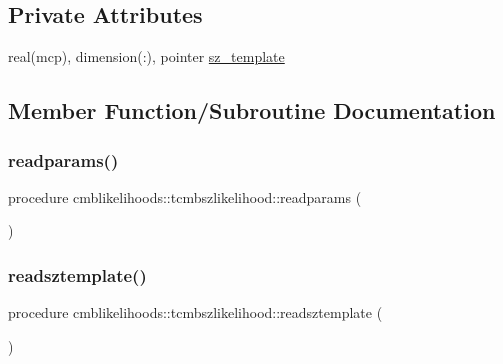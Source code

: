 \subsection*{Private Attributes}
\begin{DoxyCompactItemize}
\item 
real(mcp), dimension(\+:), pointer \mbox{\hyperlink{structcmblikelihoods_1_1tcmbszlikelihood_a625b6c3263513211095b9b106aa01453}{sz\+\_\+template}}
\end{DoxyCompactItemize}


\subsection{Member Function/\+Subroutine Documentation}
\mbox{\label{structcmblikelihoods_1_1tcmbszlikelihood_a4db5c38bc1d6c5e67be755992f6c43f3}} 
\subsubsection{\texorpdfstring{readparams()}{readparams()}}
{\footnotesize\ttfamily procedure cmblikelihoods\+::tcmbszlikelihood\+::readparams (\begin{DoxyParamCaption}{ }\end{DoxyParamCaption})\hspace{0.3cm}{\ttfamily [private]}}

\mbox{\label{structcmblikelihoods_1_1tcmbszlikelihood_ae72cb577ffc417efa59274dc1bcaf100}} 
\subsubsection{\texorpdfstring{readsztemplate()}{readsztemplate()}}
{\footnotesize\ttfamily procedure cmblikelihoods\+::tcmbszlikelihood\+::readsztemplate (\begin{DoxyParamCaption}{ }\end{DoxyParamCaption})\hspace{0.3cm}{\ttfamily [private]}}



